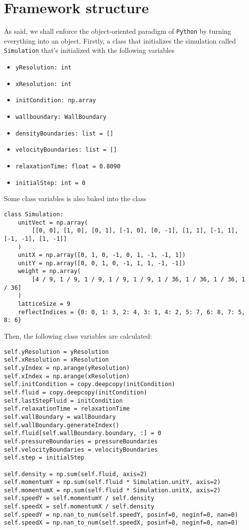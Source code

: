 \chapter{Framework structure}
\label{sec:model-structure}

As said, we shall enforce the object-oriented paradigm of \texttt{Python} by turning everything into an object. Firstly, a class that initializes the simulation called \texttt{Simulation} that's initialized with the following variables
\begin{itemize}[noitemsep]
	\item \texttt{yResolution: int}
	\item \texttt{xResolution: int}
	\item \texttt{initCondition: np.array}
	\item \texttt{wallboundary: WallBoundary}
	\item \texttt{densityBoundaries: list = []}
	\item \texttt{velocityBoundaries: list = []}
	\item \texttt{relaxationTime: float = 0.8090}
	\item \texttt{initialStep: int = 0}
\end{itemize}
Some class variables is also baked into the class
\begin{verbatim}
class Simulation:
    unitVect = np.array(
        [[0, 0], [1, 0], [0, 1], [-1, 0], [0, -1], [1, 1], [-1, 1], [-1, -1], [1, -1]]
    )
    unitX = np.array([0, 1, 0, -1, 0, 1, -1, -1, 1])
    unitY = np.array([0, 0, 1, 0, -1, 1, 1, -1, -1])
    weight = np.array(
        [4 / 9, 1 / 9, 1 / 9, 1 / 9, 1 / 9, 1 / 36, 1 / 36, 1 / 36, 1 / 36]
    )
    latticeSize = 9
    reflectIndices = {0: 0, 1: 3, 2: 4, 3: 1, 4: 2, 5: 7, 6: 8, 7: 5, 8: 6}
\end{verbatim}
Then, the following class variables are calculated:
\begin{verbatim}
self.yResolution = yResolution
self.xResolution = xResolution
self.yIndex = np.arange(yResolution)
self.xIndex = np.arange(xResolution)
self.initCondition = copy.deepcopy(initCondition)
self.fluid = copy.deepcopy(initCondition)
self.lastStepFluid = initCondition
self.relaxationTime = relaxationTime
self.wallBoundary = wallBoundary
self.wallBoundary.generateIndex()
self.fluid[self.wallBoundary.boundary, :] = 0
self.pressureBoundaries = pressureBoundaries
self.velocityBoundaries = velocityBoundaries
self.step = initialStep

self.density = np.sum(self.fluid, axis=2)
self.momentumY = np.sum(self.fluid * Simulation.unitY, axis=2)
self.momentumX = np.sum(self.fluid * Simulation.unitX, axis=2)
self.speedY = self.momentumY / self.density
self.speedX = self.momentumX / self.density
self.speedY = np.nan_to_num(self.speedY, posinf=0, neginf=0, nan=0)
self.speedX = np.nan_to_num(self.speedX, posinf=0, neginf=0, nan=0)
\end{verbatim}
